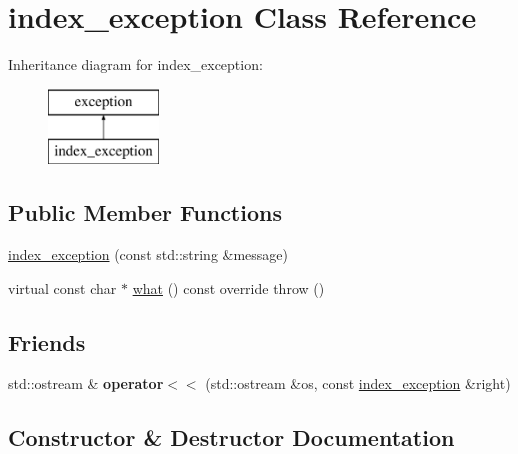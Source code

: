 \hypertarget{classindex__exception}{}\section{index\+\_\+exception Class Reference}
\label{classindex__exception}
Inheritance diagram for index\+\_\+exception\+:\begin{figure}[H]
\begin{center}
\leavevmode
\includegraphics[height=2.000000cm]{classindex__exception}
\end{center}
\end{figure}
\subsection*{Public Member Functions}
\begin{DoxyCompactItemize}
\item 
\hyperlink{classindex__exception_a45efcd9661fe268d97ca4dd4379b2fc8}{index\+\_\+exception} (const std\+::string \&message)
\item 
virtual const char $\ast$ \hyperlink{classindex__exception_a24b7e09d16d48e79c2a200cdd334b906}{what} () const override  throw ()
\end{DoxyCompactItemize}
\subsection*{Friends}
\begin{DoxyCompactItemize}
\item 
\mbox{\label{classindex__exception_a6804bb8fe090a779efb0c7d961e250ee}} 
std\+::ostream \& {\bfseries operator$<$$<$} (std\+::ostream \&os, const \hyperlink{classindex__exception}{index\+\_\+exception} \&right)
\end{DoxyCompactItemize}


\subsection{Constructor \& Destructor Documentation}
\mbox{\label{classindex__exception_a45efcd9661fe268d97ca4dd4379b2fc8}} 

